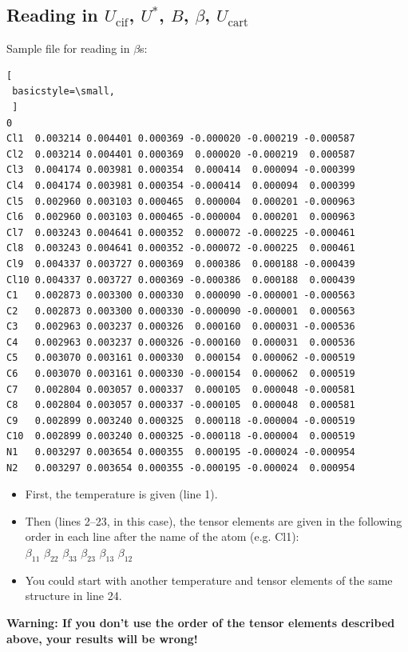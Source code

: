 \documentclass[12pt,a4paper]{article}
\begin{document}
 \subsection{Reading in $U_{\mathrm{cif}}$, $U^*$, $B$, $\beta$, $U_{\mathrm{cart}}$}\label{BetaFile}
Sample file for reading in $\beta$s:
\begin{lstlisting}[
 basicstyle=\small,
 ]
0 
Cl1  0.003214 0.004401 0.000369 -0.000020 -0.000219 -0.000587
Cl2  0.003214 0.004401 0.000369  0.000020 -0.000219  0.000587
Cl3  0.004174 0.003981 0.000354  0.000414  0.000094 -0.000399
Cl4  0.004174 0.003981 0.000354 -0.000414  0.000094  0.000399
Cl5  0.002960 0.003103 0.000465  0.000004  0.000201 -0.000963
Cl6  0.002960 0.003103 0.000465 -0.000004  0.000201  0.000963
Cl7  0.003243 0.004641 0.000352  0.000072 -0.000225 -0.000461
Cl8  0.003243 0.004641 0.000352 -0.000072 -0.000225  0.000461
Cl9  0.004337 0.003727 0.000369  0.000386  0.000188 -0.000439
Cl10 0.004337 0.003727 0.000369 -0.000386  0.000188  0.000439
C1   0.002873 0.003300 0.000330  0.000090 -0.000001 -0.000563
C2   0.002873 0.003300 0.000330 -0.000090 -0.000001  0.000563
C3   0.002963 0.003237 0.000326  0.000160  0.000031 -0.000536
C4   0.002963 0.003237 0.000326 -0.000160  0.000031  0.000536
C5   0.003070 0.003161 0.000330  0.000154  0.000062 -0.000519
C6   0.003070 0.003161 0.000330 -0.000154  0.000062  0.000519
C7   0.002804 0.003057 0.000337  0.000105  0.000048 -0.000581
C8   0.002804 0.003057 0.000337 -0.000105  0.000048  0.000581
C9   0.002899 0.003240 0.000325  0.000118 -0.000004 -0.000519
C10  0.002899 0.003240 0.000325 -0.000118 -0.000004  0.000519
N1   0.003297 0.003654 0.000355  0.000195 -0.000024 -0.000954
N2   0.003297 0.003654 0.000355 -0.000195 -0.000024  0.000954
 \end{lstlisting}

 \begin{itemize}
  \item First, the temperature is given (line 1).
  \item Then (lines 2--23, in this case), the tensor elements are given in the following order in each line after the name of the atom (e.g. Cl1):\\ $\beta_{11}$ $\beta_{22}$ $\beta_{33}$ $\beta_{23}$ $\beta_{13}$ $\beta_{12}$ 
  \item You could start with another temperature and tensor elements of the same structure in line 24.
 \end{itemize}
 \textbf{Warning: If you don't use the order of the tensor elements described above, your results will be wrong!}
 \newpage
\end{document}
